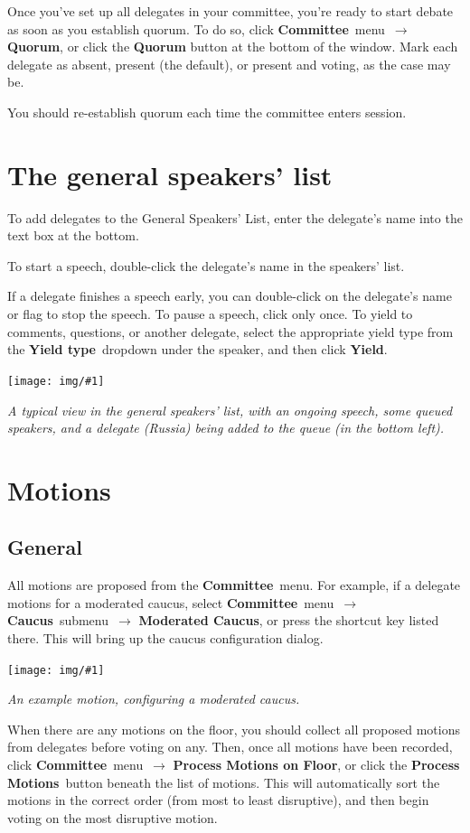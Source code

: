 \documentclass{article}
\newcommand{\navstep}[2]{\navitem{#1}~{#2}~$\rightarrow$}
\newcommand{\navitem}[1]{\textbf{#1}}
\newcommand{\encouragebreak}[1]{\vfil\penalty-#1\vfilneg}
\newcommand{\img}[2]{%
  \begin{center}
    \vspace{6pt}
    \encouragebreak{100}
    \centerline{\texttt{[image: img/\#1]}}
    {\slshape #2}
    \encouragebreak{300}
  \end{center}
}
\begin{document}
Once you've set up all delegates in your committee, you're ready to start debate as soon as you establish quorum.
To do so, click \navstep{Committee}{menu} \navitem{Quorum}, or click the \navitem{Quorum} button at the bottom of the window.
Mark each delegate as absent, present (the default), or present and voting, as the case may be.

You should re-establish quorum each time the committee enters session.

\section{The general speakers' list}

To add delegates to the General Speakers' List, enter the delegate's name into the text box at the bottom.

To start a speech, double-click the delegate's name in the speakers' list.

If a delegate finishes a speech early, you can double-click on the delegate's name or flag to stop the speech.
To pause a speech, click only once.
To yield to comments, questions, or another delegate, select the appropriate yield type from the \navitem{Yield type}~dropdown under the speaker, and then click \navitem{Yield}.

\img{general_speakers_list}{%
  A typical view in the general speakers' list, with an ongoing speech, some queued speakers, and a delegate (Russia) being added to the queue (in the bottom left).
}

\section{Motions}

\subsection{General}

All motions are proposed from the \navitem{Committee}~menu.
For example, if a delegate motions for a moderated caucus, select \navstep{Committee}{menu} \navstep{Caucus}{submenu} \navitem{Moderated Caucus}, or press the shortcut key listed there.
This will bring up the caucus configuration dialog.

\img{moderated_caucus_configuration}{An example motion, configuring a moderated caucus.}

When there are any motions on the floor, you should collect all proposed motions from delegates before voting on any.
Then, once all motions have been recorded, click \navstep{Committee}{menu} \navitem{Process Motions on Floor}, or click the \navitem{Process Motions}~button beneath the list of motions.
This will automatically sort the motions in the correct order (from most to least disruptive), and then begin voting on the most disruptive motion.
\end{document}
